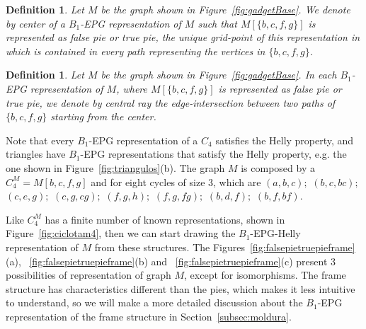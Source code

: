 \documentclass[a4paper,11pt]{article}
\newtheorem{defi}[theorem]{Definition}
\begin{document}
 


\begin{defi}
\label{lab:lab1}
Let $M$ be the graph shown in Figure~\ref{fig:gadgetBase}. We denote by \emph{center} of a $B_1$-EPG representation of $M$ such that $M[\{b, c, f, g \}]$ is represented as false pie or true pie, the unique grid-point of this representation in which is contained in every path representing the vertices in $ \{b, c, f, g \}$.
\end{defi}

\begin{defi}\citep{golumbic2009}
Let $M$ be the graph shown in Figure~\ref{fig:gadgetBase}. In each $B_1$-EPG representation of $M$, where $M[\{b, c, f, g \}]$ is represented as false pie or true pie, we denote by \emph {central ray} the edge-intersection  between two paths of $ \{b, c, f, g \} $ starting from the center.
\end{defi}

Note that every $B_1$-EPG representation of a $C_4$ satisfies the Helly property, and triangles have $B_1$-EPG representations that satisfy the Helly property, e.g. the one shown in Figure~\ref{fig:triangulos}(b). The graph $M$ is composed by a $C_4^M=M[b, c, f, g]$ and for eight cycles of size 3, which are $(a,b,c);$ $(b,c,bc);$ $(c,e,g);$ $(c,g,cg);$ $(f,g,h);$ $(f,g,fg);$ $(b,d,f);$ $(b,f,bf).$

Like $C_4^M$ has a finite number of known representations, shown in Figure~\ref{fig:ciclotam4}, then we can start drawing the $B_{1}$-EPG-Helly representation of $M$ from these structures. The Figures~\ref{fig:falsepietruepieframe}(a), ~\ref{fig:falsepietruepieframe}(b) and ~\ref{fig:falsepietruepieframe}(c) present 3 possibilities of representation of graph $M$, except for isomorphisms. The frame structure has characteristics different than the pies, which makes it less intuitive to understand, so we will make a more detailed discussion about the $B_1$-EPG representation of the frame structure in Section~\ref{subsec:moldura}.
\end{document}
